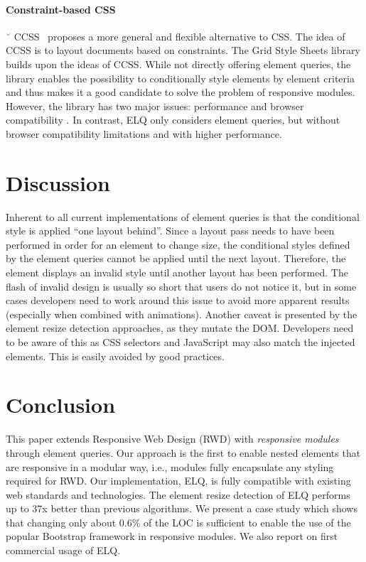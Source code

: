 \documentclass[sigconf,9pt]{acmart}
\newcommand{\elq}{ELQ}
\begin{document}
  \paragraph{Constraint-based CSS}˘
  CCSS~\cite{badros1999constraint} proposes a more general and flexible alternative to CSS.
  The idea of CCSS is to layout documents based on constraints.
  The Grid Style Sheets library \cite{eq_imp_gss} builds upon the ideas of CCSS.
  While not directly offering element queries, the library enables the possibility to conditionally style elements by element criteria and thus makes it a good candidate to solve the problem of responsive modules.
  However, the library has two major issues: performance and browser compatibility \cite{gss_issue}.
  In contrast, \elq{} only considers element queries, but without browser compatibility limitations and with higher performance.

  \section{Discussion}\label{sec:discussion}
      Inherent to all current implementations of element queries is that the conditional style is applied ``one layout behind''.
      Since a layout pass needs to have been performed in order for an element to change size, the conditional styles defined by the element queries cannot be applied until the next layout.
      Therefore, the element displays an invalid style until another layout has been performed.
      The flash of invalid design is usually so short that users do not notice it, but in some cases developers need to work around this issue to avoid more apparent results (especially when combined with animations).
      Another caveat is presented by the element resize detection approaches, as they mutate the DOM.
      Developers need to be aware of this as CSS selectors and JavaScript may also match the injected elements.
      This is easily avoided by good practices.

  \section{Conclusion}\label{sec:conclusion}
    This paper extends Responsive Web Design (RWD) with {\em responsive
      modules} through element queries.  Our approach is the first to
    enable nested elements that are responsive in a modular way, i.e.,
    modules fully encapsulate any styling required for RWD.  Our
    implementation, \elq{}, is fully compatible with existing web
    standards and technologies. The element resize detection of \elq{}
    performs up to 37x better than previous algorithms.  We present a
    case study which shows that changing only about 0.6\% of the LOC is
    sufficient to enable the use of the popular Bootstrap framework in
    responsive modules.  We also report on first commercial usage of
    \elq{}.



\end{document}
